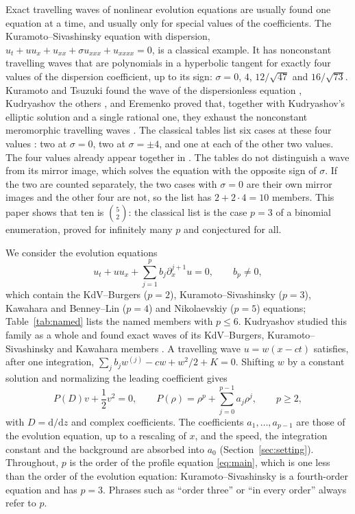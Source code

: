 \documentclass[11pt]{article}
\theoremstyle{definition}
\theoremstyle{remark}
\numberwithin{equation}{section}
\begin{document}
Exact travelling waves of nonlinear evolution equations are usually
found one equation at a time, and usually only for special values of the
coefficients. The Kuramoto--Sivashinsky equation with dispersion,
\(u_t+uu_x+u_{xx}+\sigma u_{xxx}+u_{xxxx}=0\), is a classical example.
It has nonconstant travelling waves that are polynomials in a hyperbolic
tangent for exactly four values of the dispersion coefficient, up to its
sign: \(\sigma=0\), \(4\), \(12/\sqrt{47}\) and \(16/\sqrt{73}\).
Kuramoto and Tsuzuki found the wave of the dispersionless equation
\citep{KuramotoTsuzuki1976}, Kudryashov the others
\citep{Kudryashov1988,Kudryashov1989,Kudryashov1990,Kudryashov1991}, and
Eremenko proved that, together with Kudryashov's elliptic solution and a
single rational one, they exhaust the nonconstant meromorphic travelling
waves \citep{Eremenko2006}. The classical tables list six cases at these
four values \citep{KudryashovZargaryan1996,ConteMusette2009}: two at
\(\sigma=0\), two at \(\sigma=\pm4\), and one at each of the other two
values. The four values already appear together in
\citet[Eq.~(39)]{Kudryashov1989}. The tables do not distinguish a wave
from its mirror image, which solves the equation with the opposite sign
of \(\sigma\). If the two are counted separately, the two cases with
\(\sigma=0\) are their own mirror images and the other four are not, so
the list has \(2+2\cdot4=10\) members. This paper shows that ten is
\(\binom52\): the classical list is the case \(p=3\) of a binomial
enumeration, proved for infinitely many \(p\) and conjectured for all.

We consider the evolution equations
\[
 u_t+uu_x+\sum_{j=1}^{p}b_j\partial_x^{j+1}u=0,\qquad b_p\ne0,
\]
which contain the KdV--Burgers (\(p=2\)), Kuramoto--Sivashinsky
(\(p=3\)), Kawahara and Benney--Lin (\(p=4\)) and Nikolaevskiy (\(p=5\))
equations; Table~\ref{tab:named} lists the named members with \(p\le6\).
Kudryashov studied this family as a whole and found exact waves of its
KdV--Burgers, Kuramoto--Sivashinsky and Kawahara members
\citep{Kudryashov1989}. A travelling wave \(u=w(x-ct)\) satisfies, after
one integration, \(\sum_jb_jw^{(j)}-cw+w^2/2+K=0\). Shifting \(w\) by a
constant solution and normalizing the leading coefficient gives
\begin{equation}\label{eq:main}
 P(D)v+\frac12v^2=0,\qquad
 P(\rho)=\rho^p+\sum_{j=0}^{p-1}a_j\rho^j,\qquad p\ge2,
\end{equation}
with \(D=\mathrm d/\mathrm dz\) and complex coefficients. The
coefficients \(a_1,\ldots,a_{p-1}\) are those of the evolution equation,
up to a rescaling of \(x\), and the speed, the integration constant and
the background are absorbed into \(a_0\) (Section~\ref{sec:setting}).
Throughout, \(p\) is the order of the profile equation \eqref{eq:main},
which is one less than the order of the evolution equation:
Kuramoto--Sivashinsky is a fourth-order equation and has \(p=3\).
Phrases such as ``order three'' or ``in every order'' always refer to
\(p\).
\end{document}

